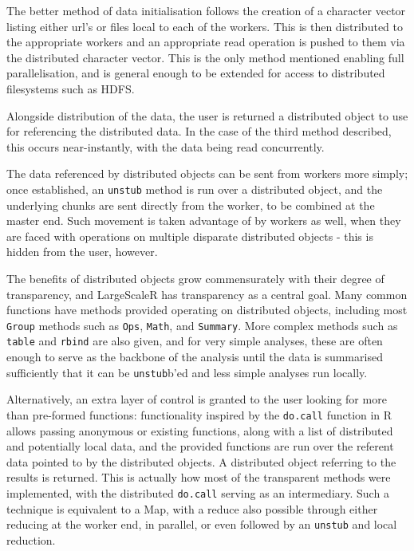 The better method of data initialisation follows the creation of a character vector listing either url's or files local to each of the workers.
This is then distributed to the appropriate workers and an appropriate read operation is pushed to them via the distributed character vector.
This is the only method mentioned enabling full parallelisation, and is general enough to be extended for access to distributed filesystems such as HDFS.

Alongside distribution of the data, the user is returned a distributed object to use for referencing the distributed data.
In the case of the third method described, this occurs near-instantly, with the data being read concurrently.

The data referenced by distributed objects can be sent from workers more simply; once established, an \texttt{unstub} method is run over a distributed object, and the underlying chunks are sent directly from the worker, to be combined at the master end.
Such movement is taken advantage of by workers as well, when they are faced with operations on multiple disparate distributed objects - this is hidden from the user, however.

The benefits of distributed objects grow commensurately with their degree of transparency, and LargeScaleR has transparency as a central goal.
Many common functions have methods provided operating on distributed objects, including most \texttt{Group} methods such as \texttt{Ops}, \texttt{Math}, and \texttt{Summary}.
More complex methods such as \texttt{table} and \texttt{rbind} are also given, and for very simple analyses, these are often enough to serve as the backbone of the analysis until the data is summarised sufficiently that it can be \texttt{unstub}b'ed and less simple analyses run locally.

Alternatively, an extra layer of control is granted to the user looking for more than pre-formed functions:
functionality inspired by the \texttt{do.call} function in R allows passing anonymous or existing functions, along with a list of distributed and potentially local data, and the provided functions are run over the referent data pointed to by the distributed objects.
A distributed object referring to the results is returned.
This is actually how most of the transparent methods were implemented, with the distributed \texttt{do.call} serving as an intermediary.
Such a technique is equivalent to a Map, with a reduce also possible through either reducing at the worker end, in parallel, or even followed by an \texttt{unstub} and local reduction.

